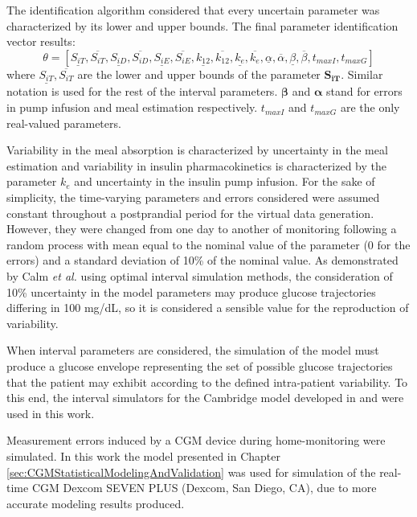 The identification algorithm considered that every uncertain parameter was characterized by its lower and upper bounds. The final parameter identification vector results:
\begin{equation}\label{eq:parametervector}
\theta=[ \underline{S_{iT}}, \overline{S_{iT}}, \underline{S_{iD}}, \overline{S_{iD}}, \underline{S_{iE}}, \overline{S_{iE}}, \underline{k_{12}}, \overline{k_{12}}, \underline{k_e}, \overline{k_e}, \underline{\alpha}, \overline{\alpha}, \underline{\beta}, \overline{\beta}, t_{maxI}, t_{maxG} ]
\end{equation}
where $\underline{S_{iT}}, \overline{S_{iT}}$ are the lower and upper bounds of the parameter $\boldsymbol{S_{iT}}$. Similar notation is used for the rest of the interval parameters. $\boldsymbol{\beta}$ and $\boldsymbol{\alpha}$ stand for errors in pump infusion and meal estimation respectively. $t_{maxI}$ and $t_{maxG}$ are the only real-valued parameters.

Variability in the meal absorption is characterized by uncertainty in the meal estimation and variability in insulin pharmacokinetics is characterized by the parameter $k_{e}$ and uncertainty in the insulin pump infusion. For the sake of simplicity, the time-varying parameters and errors considered were assumed constant throughout a postprandial period for the virtual data generation. However, they were changed from one day to another of monitoring following a random process with mean equal to the nominal value of the parameter (0 for the errors) and a standard deviation of 10\% of the nominal value. As demonstrated by Calm \textit{et al.} \cite{calm2007prediction} using optimal interval simulation methods, the consideration of 10\% uncertainty in the model parameters may produce glucose trajectories differing in 100 mg/dL, so it is considered a sensible value for the reproduction of variability.

When interval parameters are considered, the simulation of the model must produce a glucose envelope representing the set of possible glucose trajectories that the patient may exhibit according to the defined intra-patient variability. To this end, the interval simulators for the Cambridge model developed in \cite{calm2010comparison} and \cite{de2012prediction} were used in this work.

Measurement errors induced by a CGM device during home-monitoring were simulated. In this work the model presented in Chapter \ref{sec:CGMStatisticalModelingAndValidation} was used for simulation of the real-time CGM Dexcom\textsuperscript{\textregistered} SEVEN\textsuperscript{\textregistered} PLUS (Dexcom\textsuperscript{\textregistered}, San Diego, CA), due to more accurate modeling results produced. 

